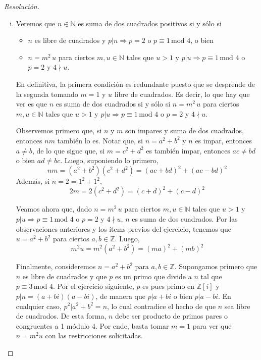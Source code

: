 \documentclass[a4paper,11pt]{article}
\newcommand{\ZZ}{\ensuremath{\mathbb{Z}}}
\newcommand{\Zm}[1]{\ensuremath{\mathbb{Z}[#1]}}
\newcommand{\Cong}[3]{\ensuremath{#1 \equiv #2 \, \textrm{mod } #3}}
\newcommand{\Div}[2]{\ensuremath{#1 | #2}}
\begin{document}
\begin{proof}[Resoluci\'on]
\begin{enumerate}[i.]
\item Veremos que $n \in \mathbb{N}$ es suma de dos cuadrados positivos si y sólo si
\begin{itemize}
    \item $n$ es libre de cuadrados y $\Div{p}{n} \Rightarrow p = 2$ o \Cong{p}{1}{4}, o bien
    \item $n = m^2 \, u$ para ciertos $m, u \in \mathbb{N}$ tales que 
    $u > 1$ y $\Div{p}{u} \Rightarrow \Cong{p}{1}{4}$ o $p = 2$ y $4 \nmid u$.
\end{itemize}

En definitiva, la primera condición es redundante puesto que se desprende de la 
segunda tomando $m = 1$ y $u$ libre de cuadrados. Es decir, lo que hay que ver es que
$n$ es suma de dos cuadrados si y sólo si $n = m^2 \, u$ para ciertos $m, u \in \mathbb{N}$ tales que 
    $u > 1$ y $\Div{p}{u} \Rightarrow \Cong{p}{1}{4}$ o $p = 2$ y $4 \nmid u$.

Observemos primero que, si $n$ y $m$ son impares y suma de dos cuadrados, entonces
$nm$ también lo es. Notar que, si $n = a^2 + b^2$ y $n$ es impar, entonces $a \neq b$,
de lo que sigue que, si $m = c^2 + d^2$ es también impar, entonces $ac \neq bd$ o bien
$ad \neq bc$. Luego, suponiendo lo primero, 
$$nm = (a^2 + b^2) (c^2 + d^2) = (ac + bd)^2 + (ac - bd)^2$$
Además, si $n = 2 = 1^2 + 1^2$,
$$2m = 2 (c^2 + d^2) = (c + d)^2 + (c - d)^2$$ 

Veamos ahora que, dado $n = m^2 \, u$ para ciertos $m, u \in \mathbb{N}$ tales que 
    $u > 1$ y $\Div{p}{u} \Rightarrow \Cong{p}{1}{4}$ o $p = 2$ y $4 \nmid u$, $n$ es suma
de dos cuadrados. Por las observaciones anteriores y los ítems previos del ejercicio, 
tenemos que $u = a^2 + b^2$ para ciertos $a, b \in \ZZ$. Luego,
$$m^2 u = m^2 (a^2 + b^2) = (ma)^2 + (mb)^2$$
 
Finalmente, consideremos $n = a^2 + b^2$ para $a, b \in \ZZ$. Supongamos primero que
$n$ es libre de cuadrados y que $p$ es un primo que divide a $n$ tal que \Cong{p}{3}{4}.
Por el ejercicio siguiente, $p$ es pues primo en \Zm{i} y \Div{p}{n = (a+bi)(a-bi)}, de
manera que \Div{p}{a+bi} o bien \Div{p}{a-bi}. En cualquier caso, \Div{p^2}{a^2 + b^2 = n}, lo
cual contradice el hecho de que $n$ sea libre de cuadrados. De esta forma, $n$ debe ser
producto de primos pares o congruentes a 1 módulo 4. Por ende,
basta tomar $m = 1$ para ver que $n = m^2 u$ con las restricciones solicitadas.


\end{enumerate}
\end{proof}
\end{document}
